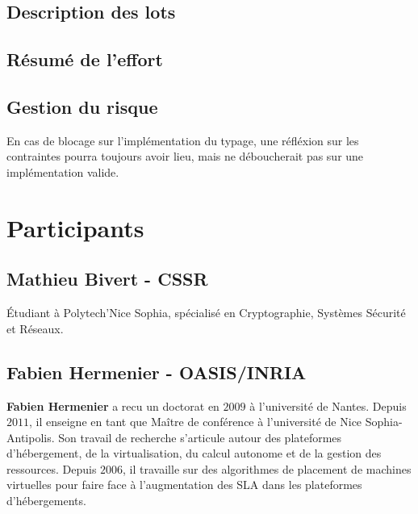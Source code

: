 \documentclass[a4paper]{article}
\begin{document}
\subsection{Description des lots}
\subsection{Résumé de l'effort}
\subsection{Gestion du risque}
En cas de blocage sur l'implémentation du typage, une réfléxion sur
les contraintes pourra toujours avoir lieu, mais ne déboucherait pas
sur une implémentation valide.
\section{Participants}
\subsection{Mathieu Bivert - CSSR}
Étudiant à Polytech'Nice Sophia, spécialisé en Cryptographie, Systèmes
Sécurité et Réseaux.

\subsection{Fabien Hermenier - OASIS/INRIA}
\textbf{Fabien Hermenier} a recu un doctorat en $2009$ à l'université
de Nantes. Depuis $2011$, il enseigne en tant que Maître de conférence
à l'université de Nice Sophia-Antipolis. Son travail de recherche
s'articule autour des plateformes d'hébergement, de la virtualisation,
du calcul autonome et de la gestion des ressources. Depuis $2006$, il
travaille sur des algorithmes de placement de machines virtuelles pour
faire face à l'augmentation des SLA dans les plateformes d'hébergements.

\newpage
{}


\end{document}
